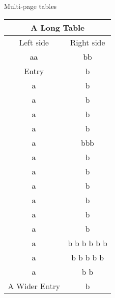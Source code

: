 \documentclass{article}
\begin{document}
Multi-page tables

\begin{longtable}{|c|c|}
    \hline
    \multicolumn{2}{|c|}{A Long Table}    \\
    \hline
    Left side       & Right side        \\
    \hline
    \endhead %
    \hline
    \endfoot
    aa              & bb                \\
    Entry           & b                 \\
    a               & b                 \\
    a               & b                 \\
    a               & b                 \\
    a               & b                 \\
    a               & bbb               \\
    a               & b                 \\
    a               & b                 \\
    a               & b                 \\
    a               & b                 \\
    a               & b                 \\
    a               & b                 \\
    a               & b b b b b b       \\
    a               & b b b b b         \\
    a               & b b               \\
    A Wider Entry   & b                 \\
\end{longtable}
\end{document}
